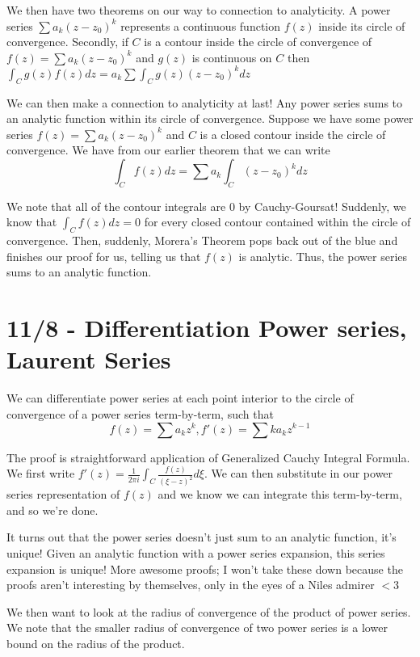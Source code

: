 \documentclass[10pt]{report}
\begin{document}
We then have two theorems on our way to connection to analyticity. A power series $\sum a_k (z-z_0)^k$ represents a continuous function $f(z)$ inside its circle of convergence. Secondly, if $C$ is a contour inside the circle of convergence of $f(z) = \sum a_k (z-z_0)^k$ and $g(z)$ is continuous on $C$ then $\int_C g(z)f(z) dz = a_k \sum \int_C g(z)(z-z_0)^k dz$

We can then make a connection to analyticity at last! Any power series sums to an analytic function within its circle of convergence. Suppose we have some power series $f(z) = \sum a_k (z-z_0)^k$ and $C$ is a closed contour inside the circle of convergence. We have from our earlier theorem that we can write
$$\int_C f(z) dz = \sum a_k \int_C (z-z_0)^k dz$$

We note that all of the contour integrals are $0$ by Cauchy-Goursat! Suddenly, we know that $\int_C f(z) dz = 0$ for every closed contour contained within the circle of convergence. Then, suddenly, Morera's Theorem pops back out of the blue and finishes our proof for us, telling us that $f(z)$ is analytic. Thus, the power series sums to an analytic function. 

\chapter{11/8 - Differentiation Power series, Laurent Series}

We can differentiate power series at each point interior to the circle of convergence of a power series term-by-term, such that
$$f(z) = \sum a_k z^k, f'(z) = \sum ka_kz^{k-1}$$

The proof is straightforward application of Generalized Cauchy Integral Formula. We first write $f'(z) = \frac{1}{2\pi i} \int_C \frac{f(z)}{(\xi - z)^2}d\xi$. We can then substitute in our power series representation of $f(z)$ and we know we can integrate this term-by-term, and so we're done.

It turns out that the power series doesn't just sum to an analytic function, it's unique! Given an analytic function with a power series expansion, this series expansion is unique! More awesome proofs; I won't take these down because the proofs aren't interesting by themselves, only in the eyes of a Niles admirer $<$3

We then want to look at the radius of convergence of the product of power series. We note that the smaller radius of convergence of two power series is a lower bound on the radius of the product.
\end{document}
